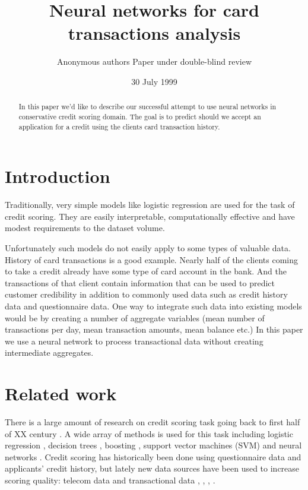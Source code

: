 \documentclass{sigkddExp}
\begin{document}
\title{Neural networks for card transactions analysis}

\author{
\alignauthor Anonymous authors
Paper under double-blind review
}

\date{30 July 1999}
\maketitle
\begin{abstract}
In this paper we'd like to describe our successful attempt to use neural networks in conservative credit scoring domain.
The goal is to predict should we accept an application for a credit using the clients card transaction history.
\end{abstract}

\section{Introduction}
Traditionally, very simple models like logistic regression are used for the task of credit scoring. They are easily interpretable, computationally effective and have modest requirements to the dataset volume.

Unfortunately such models do not easily apply to some types of valuable data. History of card transactions is a good example. Nearly half of the clients coming to take a credit already have some type of card account in the bank. And the transactions of that client contain information that can be used to predict customer credibility in addition to commonly used data such as credit history data and questionnaire data. One way to integrate such data into existing models would be by creating a number of aggregate variables (mean number of transactions per day, mean transaction amounts, mean balance etc.) In this paper we use a neural network to process transactional data without creating intermediate aggregates.

\section{Related work}

There is a large amount of research on credit scoring task going back to first half of XX century \cite{NBERc12952}. A wide array of methods is used for this task including logistic regression \cite{RePEc:cup:jfinqa:v:15:y:1980:i:03:p:757-770_00}, decision trees \cite{makowski1985credit}, boosting \cite{bastos2007credit}, support vector machines (SVM) \cite{HUANG2007847} and neural networks \cite{west2000neural}. Credit scoring has historically been done using questionnaire data and applicants' credit history, but lately new data sources have been used to increase scoring quality: telecom data \cite{bjorkegren2017behavior} and transactional data \cite{khandani2010consumer}, \cite{bellotti2013forecasting}, \cite{KVAMME2018207}, \cite{chi2012hybrid}.
\end{document}
